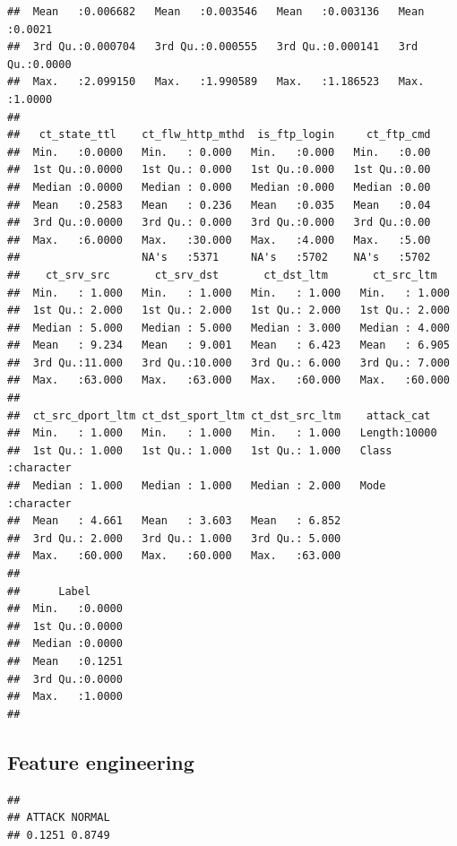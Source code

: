 \documentclass[
]{article}
\begin{document}
\begin{verbatim}
##  Mean   :0.006682   Mean   :0.003546   Mean   :0.003136   Mean   :0.0021  
##  3rd Qu.:0.000704   3rd Qu.:0.000555   3rd Qu.:0.000141   3rd Qu.:0.0000  
##  Max.   :2.099150   Max.   :1.990589   Max.   :1.186523   Max.   :1.0000  
##                                                                           
##   ct_state_ttl    ct_flw_http_mthd  is_ftp_login     ct_ftp_cmd  
##  Min.   :0.0000   Min.   : 0.000   Min.   :0.000   Min.   :0.00  
##  1st Qu.:0.0000   1st Qu.: 0.000   1st Qu.:0.000   1st Qu.:0.00  
##  Median :0.0000   Median : 0.000   Median :0.000   Median :0.00  
##  Mean   :0.2583   Mean   : 0.236   Mean   :0.035   Mean   :0.04  
##  3rd Qu.:0.0000   3rd Qu.: 0.000   3rd Qu.:0.000   3rd Qu.:0.00  
##  Max.   :6.0000   Max.   :30.000   Max.   :4.000   Max.   :5.00  
##                   NA's   :5371     NA's   :5702    NA's   :5702  
##    ct_srv_src       ct_srv_dst       ct_dst_ltm       ct_src_ltm    
##  Min.   : 1.000   Min.   : 1.000   Min.   : 1.000   Min.   : 1.000  
##  1st Qu.: 2.000   1st Qu.: 2.000   1st Qu.: 2.000   1st Qu.: 2.000  
##  Median : 5.000   Median : 5.000   Median : 3.000   Median : 4.000  
##  Mean   : 9.234   Mean   : 9.001   Mean   : 6.423   Mean   : 6.905  
##  3rd Qu.:11.000   3rd Qu.:10.000   3rd Qu.: 6.000   3rd Qu.: 7.000  
##  Max.   :63.000   Max.   :63.000   Max.   :60.000   Max.   :60.000  
##                                                                     
##  ct_src_dport_ltm ct_dst_sport_ltm ct_dst_src_ltm    attack_cat       
##  Min.   : 1.000   Min.   : 1.000   Min.   : 1.000   Length:10000      
##  1st Qu.: 1.000   1st Qu.: 1.000   1st Qu.: 1.000   Class :character  
##  Median : 1.000   Median : 1.000   Median : 2.000   Mode  :character  
##  Mean   : 4.661   Mean   : 3.603   Mean   : 6.852                     
##  3rd Qu.: 2.000   3rd Qu.: 1.000   3rd Qu.: 5.000                     
##  Max.   :60.000   Max.   :60.000   Max.   :63.000                     
##                                                                       
##      Label       
##  Min.   :0.0000  
##  1st Qu.:0.0000  
##  Median :0.0000  
##  Mean   :0.1251  
##  3rd Qu.:0.0000  
##  Max.   :1.0000  
## 
\end{verbatim}

\subsection{Feature engineering}\label{feature-engineering}

\begin{verbatim}
## 
## ATTACK NORMAL 
## 0.1251 0.8749
\end{verbatim}
\end{document}
